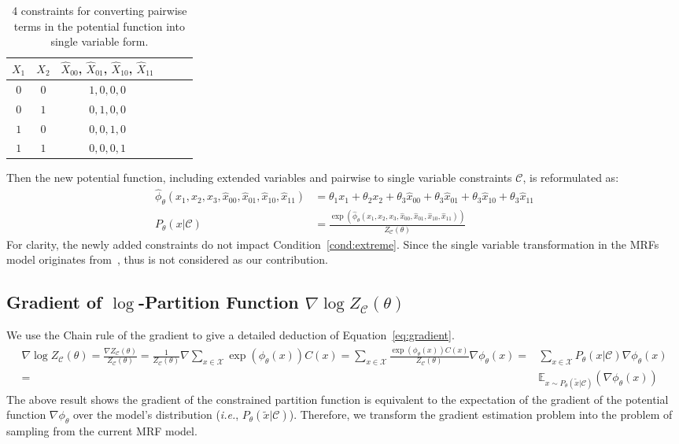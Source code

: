 \documentclass[letterpaper]{article} %
\begin{document}
\begin{table}[!ht]
    \centering
    \begin{tabular}{cc|cccc}
    \hline
        $X_1$ & $X_2$ &$\hat{X}_{00}$, $\hat{X}_{01}$, $\hat{X}_{10}$, $\hat{X}_{11}$  \\ \hline
        $0$ & $0$ & $1, 0, 0, 0$\\ 
        $0$ & $1$ & $0, 1, 0, 0$\\ 
        $1$ & $0$ & $0, 0, 1, 0$\\ 
        $1$ & $1$ & $0, 0, 0, 1$\\ 
    \hline
    \end{tabular}
    \caption{4 constraints for converting pairwise terms in the potential function into single variable form.}
    \label{tab:pairwise-to-single}
\end{table}
{Then the new potential function, including extended variables and pairwise to single variable constraints $\mathcal{C}$, is reformulated as:}
\begin{align*}
\hat{\phi}_{\theta}(x_1,x_2,x_3,\hat{x}_{00},\hat{x}_{01},\hat{x}_{10},\hat{x}_{11})&=\theta_1 x_1+\theta_2 x_2+\theta_3 \hat{x}_{00}+ \theta_3 \hat{x}_{01}+\theta_3 \hat{x}_{10}+\theta_3 \hat{x}_{11}\\
P_{\theta}(x|\mathcal{C})&=\frac{\exp(\hat{\phi}_{\theta}(x_1,x_2,x_3,\hat{x}_{00},\hat{x}_{01},\hat{x}_{10},\hat{x}_{11}))}{Z_{\mathcal{C}}(\theta)}
\end{align*}
For clarity, the newly added constraints do not impact Condition~\ref{cond:extreme}. Since the single variable transformation in the MRFs model originates from~\citet{Sang2005}, thus is not considered as our contribution.

\subsection{Gradient of $\log$-Partition Function $\nabla\log Z_\mathcal{C}(\theta)$}\label{appendix:partition}
We use the Chain rule of the gradient to give a detailed deduction of Equation~\eqref{eq:gradient}.
\begin{equation}\label{eq:full-gradient}
\begin{aligned}
\nabla\log Z_\mathcal{C}(\theta)=\frac{\nabla Z_\mathcal{C}(\theta)}{Z_\mathcal{C}(\theta)}=\frac{1}{Z_\mathcal{C}(\theta)}\nabla\sum_{x\in \mathcal{X}}\exp\left( \phi_{\theta}(x)\right)C(x)=\sum_{x\in\mathcal{X}} \frac{\exp(\phi_{\theta}(x))C(x) }{Z_\mathcal{C}(\theta)}{\nabla\phi_\theta(x)} =&\sum_{x\in \mathcal{X}} P_\theta(x|\mathcal{C}) \nabla\phi_{\theta}(x) \\
=&\mathbb{E}_{x\sim P_{\theta}(\tilde{x}|\mathcal{C})} \left({\nabla\phi_{\theta}(x)}\right)
\end{aligned}
\end{equation}
{The above result shows the gradient of the constrained partition function is equivalent to the expectation of the gradient of the potential function $\nabla\phi_{\theta}$ over the model's distribution (\textit{i.e.}, $P_{\theta}(\tilde{x}|\mathcal{C})$). Therefore, we transform the gradient estimation problem into the problem of sampling from the current MRF model.}
\end{document}
